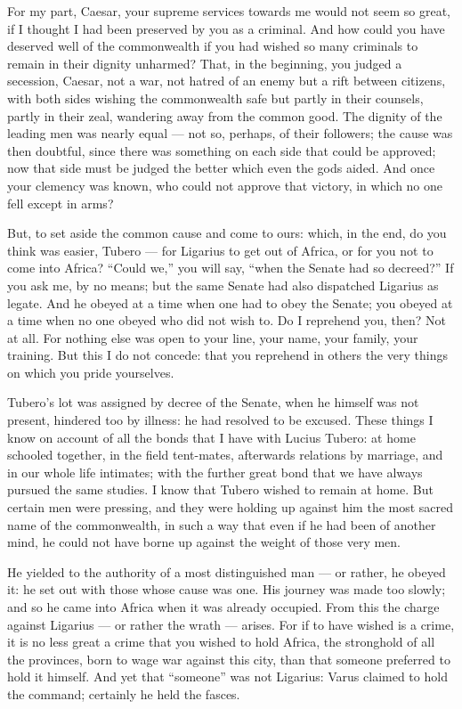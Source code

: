  For my part, Caesar, your supreme services towards me would not seem so great, if I thought I had been preserved by you as a criminal. And how could you have deserved well of the commonwealth if you had wished so many criminals to remain in their dignity unharmed? That, in the beginning, you judged a secession, Caesar, not a war, not hatred of an enemy but a rift between citizens, with both sides wishing the commonwealth safe but partly in their counsels, partly in their zeal, wandering away from the common good. The dignity of the leading men was nearly equal --- not so, perhaps, of their followers; the cause was then doubtful, since there was something on each side that could be approved; now that side must be judged the better which even the gods aided. And once your clemency was known, who could not approve that victory, in which no one fell except in arms?

 But, to set aside the common cause and come to ours: which, in the end, do you think was easier, Tubero --- for Ligarius to get out of Africa, or for you not to come into Africa? ``Could we,'' you will say, ``when the Senate had so decreed?'' If you ask me, by no means; but the same Senate had also dispatched Ligarius as legate. And he obeyed at a time when one had to obey the Senate; you obeyed at a time when no one obeyed who did not wish to. Do I reprehend you, then? Not at all. For nothing else was open to your line, your name, your family, your training. But this I do not concede: that you reprehend in others the very things on which you pride yourselves.

 Tubero's lot was assigned by decree of the Senate, when he himself was not present, hindered too by illness: he had resolved to be excused. These things I know on account of all the bonds that I have with Lucius Tubero: at home schooled together, in the field tent-mates, afterwards relations by marriage, and in our whole life intimates; with the further great bond that we have always pursued the same studies. I know that Tubero wished to remain at home. But certain men were pressing, and they were holding up against him the most sacred name of the commonwealth, in such a way that even if he had been of another mind, he could not have borne up against the weight of those very men.

 He yielded to the authority of a most distinguished man --- or rather, he obeyed it: he set out with those whose cause was one. His journey was made too slowly; and so he came into Africa when it was already occupied. From this the charge against Ligarius --- or rather the wrath --- arises. For if to have wished is a crime, it is no less great a crime that you wished to hold Africa, the stronghold of all the provinces, born to wage war against this city, than that someone preferred to hold it himself. And yet that ``someone'' was not Ligarius: Varus claimed to hold the command; certainly he held the fasces.

